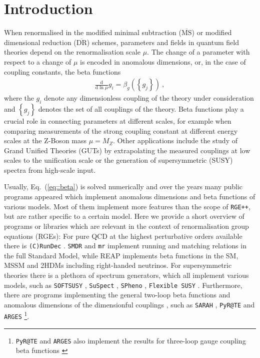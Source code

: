 \documentclass[preprint,12pt]{elsarticle}
\begin{document}
\section{Introduction}
When renormalised in the modified minimal subtraction ($\overline{\mathrm{MS}}$) or modified dimensional reduction ($\overline{\mathrm{DR}}$) schemes,
parameters and fields in quantum field theories depend on the renormalisation scale $\mu$. The change of a parameter with respect to a change of $\mu$
is encoded in anomalous dimensions, or, in the case of coupling constants, the beta functions
\begin{align}
\frac{\mathrm{d}}{\mathrm{d}\ln\mu}g_i = \beta_g\left(\left\{g_j\right\}\right)~,
\label{eq::beta}
\end{align}
where the $g_i$ denote any dimensionless coupling of the theory under consideration and $\left\{g_j\right\}$ denotes the set of
all couplings of the theory.
Beta functions play a crucial role in connecting parameters at different scales, for example when comparing measurements of the
strong coupling constant at different energy scales at the Z-Boson mass $\mu = M_Z$. Other applications include the study of
Grand Unified Theories (GUTs) by extrapolating the measured couplings at low scales to the unification scale or the generation
of supersymmetric (SUSY) spectra from high-scale input.

Usually, Eq.~(\ref{eq::beta}) is solved numerically and over the years many public programs appeared which implement
anomalous dimensions and beta functions of various models. Most of them implement more features than the scope of \texttt{RGE++}, but are rather specific to a certain model. 
Here we provide a short overview of programs or libraries which are relevant in the context of renormalisation group equations (RGEs):
For pure QCD at the highest perturbative orders available there is \texttt{(C)RunDec} \cite{Chetyrkin:2000yt,Schmidt:2012az,Herren:2017osy}. \texttt{SMDR} \cite{Martin:2019lqd} and \texttt{mr} \cite{Kniehl:2016enc}
implement running and matching relations in the full Standard Model,
while REAP \cite{Antusch:2005gp} implements beta functions in the SM, MSSM and 2HDMs including right-handed neutrinos. For supersymmetric theories there is a plethora of spectrum generators,
which all implement various models, such as \texttt{SOFTSUSY} \cite{Allanach:2001kg}, \texttt{SuSpect} \cite{Djouadi:2002ze}, \texttt{SPheno} \cite{Porod:2003um,Porod:2011nf},
\texttt{Flexible SUSY} \cite{Athron:2014yba,Athron:2017fvs}. Furthermore, there are programs implementing the general two-loop beta functions
\cite{Machacek:1983tz,Machacek:1983fi,Machacek:1984zw,Jack:1982hf,Jack:1982sr,Jack:1984vj} and anomalous dimensions of the dimensionful couplings \cite{Luo:2002ti,Sartore:2020pkk}, such
as \texttt{SARAH} \cite{Staub:2013tta}, \texttt{PyR@TE} \cite{Lyonnet:2016xiz,Sartore:2020gou} and \texttt{ARGES} \cite{Litim:2020jvl}\footnote{\texttt{PyR@TE} and \texttt{ARGES} also implement the results for three-loop gauge coupling beta functions \cite{Poole:2019kcm}}.
\end{document}
